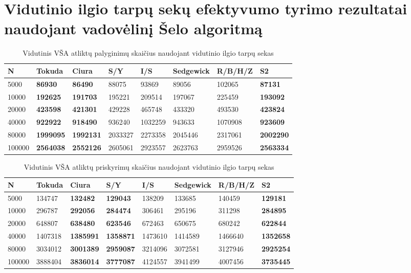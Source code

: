 \documentclass{VUMIFInfKursinis}
\begin{document}
\section{Vidutinio ilgio tarpų sekų efektyvumo tyrimo rezultatai naudojant vadovėlinį Šelo algoritmą}

\begin{table}[H]
  \caption{Vidutinis VŠA atliktų palyginimų skaičius naudojant vidutinio ilgio tarpų sekas}
  \label{tss_medium_comparisons}
  \begin{tabular}{|l|l|l|l|l|l|l|l|}
  \hline
  N      & Tokuda           & Ciura            & S/Y     & I/S     & Sedgewick & R/B/H/Z & S2               \\ \hline
  5000   & \textbf{86930}   & \textbf{86490}   & 88075   & 93869   & 89056     & 102065  & \textbf{87131}   \\ \hline
  10000  & \textbf{192625}  & \textbf{191703}  & 195221  & 209514  & 197067    & 225459  & \textbf{193092}  \\ \hline
  20000  & \textbf{423598}  & \textbf{421301}  & 429228  & 465748  & 433320    & 493530  & \textbf{423824}  \\ \hline
  40000  & \textbf{922922}  & \textbf{918490}  & 936240  & 1032259 & 943633    & 1070908 & \textbf{923609}  \\ \hline
  80000  & \textbf{1999095} & \textbf{1992131} & 2033327 & 2273358 & 2045446   & 2317061 & \textbf{2002290} \\ \hline
  100000 & \textbf{2564038} & \textbf{2552126} & 2605061 & 2923557 & 2623763   & 2959526 & \textbf{2563334} \\ \hline
  \end{tabular}
\end{table}

\begin{table}[H]
  \caption{Vidutinis VŠA atliktų priskyrimų skaičius naudojant vidutinio ilgio tarpų sekas}
  \label{tss_medium_assignments}
  \begin{tabular}{|l|l|l|l|l|l|l|l|}
  \hline
  N      & Tokuda  & Ciura            & S/Y              & I/S     & Sedgewick & R/B/H/Z & S2               \\ \hline
  5000   & 134747  & \textbf{132482}  & \textbf{129043}  & 138209  & 133685    & 140459  & \textbf{129181}  \\ \hline
  10000  & 296787  & \textbf{292056}  & \textbf{284474}  & 306461  & 295196    & 311298  & \textbf{284895}  \\ \hline
  20000  & 648807  & \textbf{638480}  & \textbf{623546}  & 672463  & 650675    & 680242  & \textbf{622844}  \\ \hline
  40000  & 1407318 & \textbf{1385991} & \textbf{1358871} & 1473610 & 1414589   & 1466640 & \textbf{1352658} \\ \hline
  80000  & 3034012 & \textbf{3001389} & \textbf{2959087} & 3214096 & 3072581   & 3127946 & \textbf{2925254} \\ \hline
  100000 & 3888404 & \textbf{3836014} & \textbf{3777087} & 4124557 & 3941499   & 4007456 & \textbf{3735445} \\ \hline
  \end{tabular}
\end{table}
\end{document}
